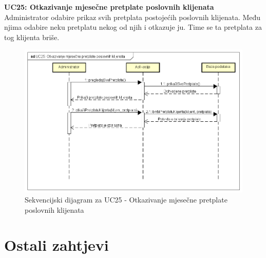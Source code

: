 			\textbf{UC25: Otkazivanje mjesečne pretplate poslovnih klijenata}\\
			\noindent \normalsize{Administrator odabire prikaz svih pretplata postojećih poslovnih klijenata. Među njima odabire neku pretplatu nekog od njih i otkazuje ju. Time se ta pretplata za tog klijenta briše.} \\
			\begin{figure}[H]
				\includegraphics[scale=0.6]{dijagrami/sekv_uc25.PNG} 
				\centering
				\caption{Sekvencijski dijagram za UC25 - Otkazivanje mjesečne pretplate poslovnih klijenata}
				\label{fig:sekv_uc25}%
			\end{figure}
				\eject
	
		\section{Ostali zahtjevi}
		
		 
			
